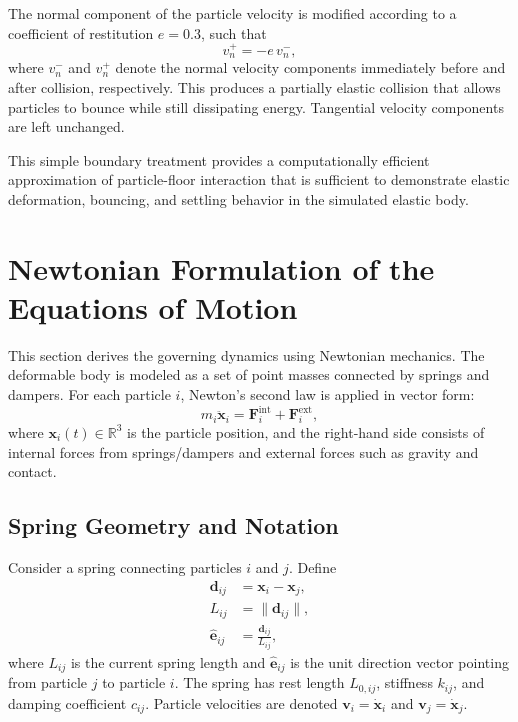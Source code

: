 \documentclass[manuscript,nonacm,12pt,letterpaper]{acmart}
\begin{document}
The normal component of the particle velocity is modified according to a coefficient of restitution $e = 0.3$, such that
\[
v_n^{+} = -e\, v_n^{-},
\]
where $v_n^{-}$ and $v_n^{+}$ denote the normal velocity components immediately before and after collision, respectively. This produces a partially elastic collision that allows particles to bounce while still dissipating energy. Tangential velocity components are left unchanged.

This simple boundary treatment provides a computationally efficient approximation of particle-floor interaction that is sufficient to demonstrate elastic deformation, bouncing, and settling behavior in the simulated elastic body.

\section{Newtonian Formulation of the Equations of Motion}
\label{Sec4:Newtonian}

This section derives the governing dynamics using Newtonian mechanics. The deformable body is modeled as a set of point masses connected by springs and dampers. For each particle $i$, Newton's second law is applied in vector form:
\begin{equation}
m_i \ddot{\mathbf{x}}_i = \mathbf{F}_i^{\text{int}} + \mathbf{F}_i^{\text{ext}},
\label{eq:newton_2nd_law}
\end{equation}
where $\mathbf{x}_i(t) \in \mathbb{R}^3$ is the particle position, and the right-hand side consists of internal forces from springs/dampers and external forces such as gravity and contact.

\subsection{Spring Geometry and Notation}
\label{Sec4.1:SpringNotation}

Consider a spring connecting particles $i$ and $j$. Define
\begin{align}
\mathbf{d}_{ij} &= \mathbf{x}_i - \mathbf{x}_j, \\
L_{ij} &= \|\mathbf{d}_{ij}\|, \\
\hat{\mathbf{e}}_{ij} &= \frac{\mathbf{d}_{ij}}{L_{ij}},
\end{align}
where $L_{ij}$ is the current spring length and $\hat{\mathbf{e}}_{ij}$ is the unit direction vector pointing from particle $j$ to particle $i$. The spring has rest length $L_{0,ij}$, stiffness $k_{ij}$, and damping coefficient $c_{ij}$. Particle velocities are denoted $\mathbf{v}_i = \dot{\mathbf{x}}_i$ and $\mathbf{v}_j = \dot{\mathbf{x}}_j$.
\end{document}
